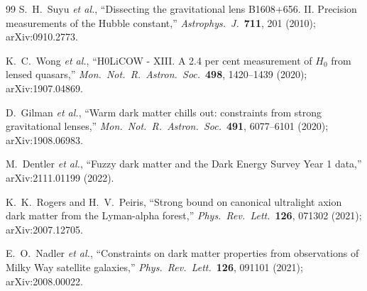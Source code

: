 \documentclass[11pt,a4paper]{article}
\theoremstyle{definition}
\theoremstyle{remark}
\begin{document}
\begin{thebibliography}{99}
S.~H.~Suyu \emph{et al.},
``Dissecting the gravitational lens B1608+656. II. Precision measurements of the Hubble constant,''
\emph{Astrophys.\ J.}\ \textbf{711}, 201 (2010);
arXiv:0910.2773.

K.~C.~Wong \emph{et al.},
``H0LiCOW - XIII. A 2.4 per cent measurement of $H_0$ from lensed quasars,''
\emph{Mon.\ Not.\ R.\ Astron.\ Soc.}\ \textbf{498}, 1420--1439 (2020);
arXiv:1907.04869.


D.~Gilman \emph{et al.},
``Warm dark matter chills out: constraints from strong gravitational lenses,''
\emph{Mon.\ Not.\ R.\ Astron.\ Soc.}\ \textbf{491}, 6077--6101 (2020);
arXiv:1908.06983.

M.~Dentler \emph{et al.},
``Fuzzy dark matter and the Dark Energy Survey Year 1 data,''
arXiv:2111.01199 (2022).

K.~K.~Rogers and H.~V.~Peiris,
``Strong bound on canonical ultralight axion dark matter from the Lyman-alpha forest,''
\emph{Phys.\ Rev.\ Lett.}\ \textbf{126}, 071302 (2021);
arXiv:2007.12705.

E.~O.~Nadler \emph{et al.},
``Constraints on dark matter properties from observations of Milky Way satellite galaxies,''
\emph{Phys.\ Rev.\ Lett.}\ \textbf{126}, 091101 (2021);
arXiv:2008.00022.

\end{thebibliography}
\end{document}
